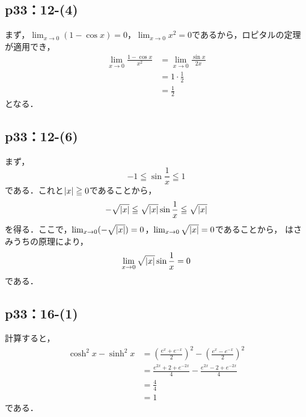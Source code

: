 \documentclass[uplatex,dvipdfmx,a4paper,10pt,fleqn]{jsarticle}
\newenvironment{tleftbar}{\begin{tbleftline}\setlength{\parindent}{1zw}}{\end{tbleftline}}
\begin{document}
\subsection*{p33：12-(4)}

\begin{tleftbar}
    まず，$\lim_{x \to 0} (1-\cos x)=0$，$\lim_{x \to 0} x^2 =0$であるから，ロピタルの定理が適用でき，
    \begin{align*} 
        \lim_{x \to 0} \frac{1-\cos x}{x^2} &= \lim_{x \to 0} \frac{\sin x}{2x} \\
        & = 1\cdot \frac{1}{2} \\
        & = \frac{1}{2}
    \end{align*} 
    となる．
\end{tleftbar}





\subsection*{p33：12-(6)}

\begin{tleftbar}
    まず，
    \[
        -1 \leqq \sin \frac{1}{x} \leqq 1 
    \]
    である．これと$\abs{x} \geqq 0$であることから，
    \[
        -\sqrt{\abs{x}}\leqq \sqrt{\abs{x}} \sin \frac{1}{x} \leqq \sqrt{\abs{x}}
     \]
     を得る．ここで，$\lim_{x \to 0} (-\sqrt{\abs{x}})=0$，$\lim_{x \to 0} \sqrt{\abs{x}}=0$であることから，
     はさみうちの原理により，
     \[
        \lim_{x \to 0} \sqrt{\abs{x}} \sin \frac{1}{x} =0
     \]
     である．
\end{tleftbar}

\subsection*{p33：16-(1)}

\begin{tleftbar} 
    計算すると，
    \begin{align*} 
        \cosh ^2 x - \sinh ^2 x & = \left ( \frac{e^x + e^{-x}}{2} \right)^2 - \left ( \frac{e^x - e^{-x}}{2} \right)^2 \\
        & = \frac{e^{2x}+2 + e^{-2x}}{4}- \frac{e^{2x}-2 + e^{-2x}}{4} \\
        & = \frac{4}{4} \\
        & =1 
    \end{align*} 
    である．
\end{tleftbar}
\end{document}
